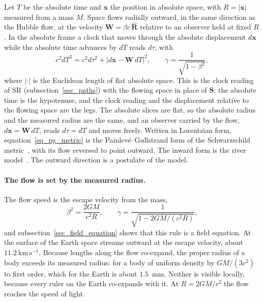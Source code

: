 \documentclass{iopjournal}
\begin{document}
Let $T$ be the absolute time and $\mathbf{x}$ the position in absolute space, with $R=|\mathbf{x}|$ measured from a mass $M$. Space flows radially outward, in the same direction as the Hubble flow, at the velocity $\mathbf{W}=\beta c\,\hat{\mathbf{R}}$ relative to an observer held at fixed $R$. In the absolute frame a clock that moves through the absolute displacement $d\mathbf{x}$ while the absolute time advances by $dT$ reads $d\tau$, with
\begin{equation}\label{eq_pg_metric}
    c^2dT^2=c^2d\tau^2+\left|d\mathbf{x}-\mathbf{W}\,dT\right|^2 ,
    \qquad
    \gamma=\frac{1}{\sqrt{1-\beta^2}} ,
\end{equation}
where $|\cdot|$ is the Euclidean length of flat absolute space. This is the clock reading of SR (subsection~\ref{sec_paths}) with the flowing space in place of $\mathbf{S}$: the absolute time is the hypotenuse, and the clock reading and the displacement relative to the flowing space are the legs. The absolute slices are flat, so the absolute radius and the measured radius are the same, and an observer carried by the flow, $d\mathbf{x}=\mathbf{W}\,dT$, reads $d\tau=dT$ and moves freely. Written in Lorentzian form, equation~\eqref{eq_pg_metric} is the Painlev\'e--Gullstrand form of the Schwarzschild metric~\cite{Painleve1921,Gullstrand1922,MartelPoisson2001}, with its flow reversed to point outward. The inward form is the river model~\cite{HamiltonLisle2008}. The outward direction is a postulate of the model.

\paragraph{The flow is set by the measured radius.} The flow speed is the escape velocity from the mass,
\begin{equation}\label{eq_flow_measured}
    \beta^2=\frac{2GM}{c^2R},
    \qquad
    \gamma=\frac{1}{\sqrt{1-2GM/(c^2R)}} ,
\end{equation}
and subsection~\ref{sec_field_equation} shows that this rule is a field equation. At the surface of the Earth space streams outward at the escape velocity, about $11.2~\mathrm{km\,s^{-1}}$. Because lengths along the flow co-expand, the proper radius of a body exceeds its measured radius: for a body of uniform density by $GM/(3c^2)$ to first order, which for the Earth is about $1.5$~mm. Neither is visible locally, because every ruler on the Earth co-expands with it. At $R=2GM/c^2$ the flow reaches the speed of light.
\end{document}
